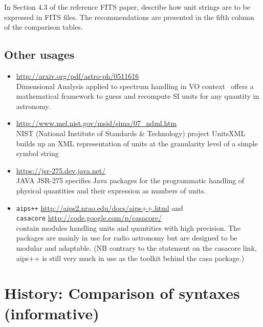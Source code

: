 \documentclass[11pt,notitlepage,onecolumn]{ivoa}
\newcommand{\violet}{\textcolor[rgb]{0.50,0.00,0.50}}
\begin{document}
In Section 4.3 of the reference FITS paper, \citet{pence10} describe how unit strings are to be expressed in
FITS files. The recommendations are presented in the fifth column
of the comparison tables.

\subsection{Other usages}

\begin{itemize}
\item
\violet{\footnotesize{\url{http://arxiv.org/pdf/astro-ph/0511616}}}\\ 
Dimensional Analysis applied to spectrum handling in VO context~\citep{osuna05}
offers a mathematical framework to guess and recompute
SI units for any quantity in astronomy.
\item
\violet{\footnotesize{\url{http://www.mel.nist.gov/msid/sima/07_ndml.htm}}}\\
NIST (National Institute of Standards \& Technology) project
UnitsXML builds up an XML representation of units at the granularity
level of a simple symbol string
\item \violet{\footnotesize{\url{https://jsr-275.dev.java.net/}}}\\
JAVA JSR-275 specifies Java packages for the programmatic
handling of physical quantities and their expression as numbers of
units.
\item  \texttt{aips++}
\violet{\footnotesize{\url{http://aips2.nrao.edu/docs/aips++.html}}} and\\
 \texttt{casacore} \violet{\footnotesize{\url{http://code.google.com/p/casacore/}}}\\ contain modules handling units and
quantities with high precision. The packages are mainly in use for
radio astronomy but are designed to be modular and adaptable.  (NB
contrary to the statement on the casacore link, aips++ is still very much in
use as the toolkit behind the {\sc casa} package.)
\end{itemize}

\clearpage
\section{History: Comparison of syntaxes (informative)\label{appx:comparisons}}
\end{document}
